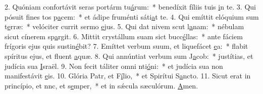 2. Quóniam confortávit seras portárm tu\uline{á}rum:~* benedíxit fíliis tuis \uline{i}n te.
3. Qui pósuit fines tos p\uline{a}cem:~* et ádipe fruménti sáti\uline{a}t te.
4. Qui emíttit elóquium sum t\uline{e}rræ:~* velóciter currit sermo \uline{e}jus.
5. Qui dat nivem scut l\uline{a}nam:~* nébulam sicut cínerem sp\uline{a}rgit.
6. Mittit crystállum suam sict bucc\uline{é}llas:~* ante fáciem frígoris ejus quis sustin\uline{é}bit?
7. Emíttet verbum suum, et liquefácet \uline{e}a:~* flabit spíritus ejus, et fluent \uline{a}quæ.
8. Qui annúntiat verbum sum J\uline{a}cob:~* justítias, et judícia sua \uline{I}sraël.
9. Non fecit táliter omni nti\uline{ó}ni:~* et judícia sua non manifestávit \uline{e}is.
10. Glória Patr, et F\uline{í}lio,~* et Spirítui S\uline{a}ncto.
11. Sicut erat in princípio, et nnc, et s\uline{e}mper,~* et in sǽcula sæculórum. \uline{A}men.
